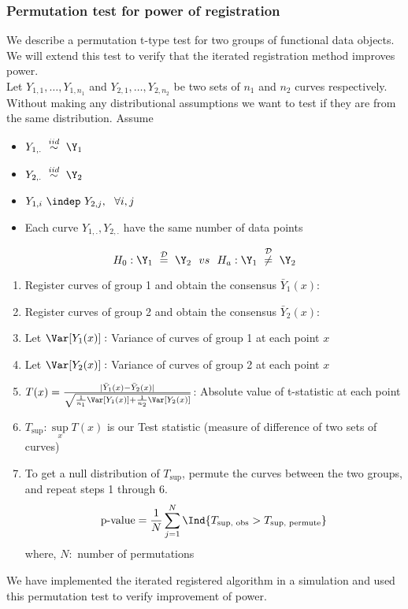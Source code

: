 \subsubsection*{Permutation test for power of registration}
We describe a permutation t-type test for two groups of functional data objects. We will extend this test to verify that the iterated registration method improves power. \\
Let $Y_{1,1}, \dots, Y_{1,n_1}$ and $Y_{2,1}, \dots, Y_{2,n_2}$ be two sets of $n_1$ and $n_2$ curves respectively. Without making any distributional assumptions we want to test if they are from the same distribution.
Assume 
\begin{itemize}
\item $Y_{1,.}\  \stackrel{iid}{\sim} \ \Y_1$
\item $Y_{2,.}\  \stackrel{iid}{\sim} \ \Y_2$
\item $Y_{1,i}\  \indep \ Y_{2,j}, \ \ \forall i, j$
\item Each curve $Y_{1,.}, Y_{2,.}$ have the same number of data points
\end{itemize}
\[ H_0: \Y_1 \ \stackrel{\mathcal{D}}{=} \ \Y_2 \ \ vs \ \ H_a: \Y_1 \ \stackrel{\mathcal{D}}{\ne} \ \Y_2 \]
\begin{enumerate}
\item Register curves of group 1 and obtain the consensus $\bar{Y}_1(x): $
\item Register curves of group 2 and obtain the consensus $\bar{Y}_2(x): $
\item Let $\Var[Y_1(x)]: $ Variance of curves of group 1 at each point $x$ 
\item Let $\Var[Y_2(x)]: $ Variance of curves of group 2 at each point $x$ 
\item $T(x) = \frac{|\bar{Y}_1(x) - \bar{Y}_2(x)|}{\sqrt{\frac{1}{n_1}\Var[Y_1(x)] + 
\frac{1}{n_2}\Var[Y_2(x)]}}$: Absolute value of t-statistic at each point
\item $T_{\text{sup}}:  \sup\limits_{x} T(x)$ is our Test statistic (measure of difference of two sets of curves)
\item To get a null distribution of $T_{\text{sup}}$, permute the curves between the two groups, and repeat steps 1 through 6. \\
\[  \text{p-value} = \frac{1}{N}\sum\limits_{j = 1}^{N}\Ind\{T_{\text{sup, obs}} > T_{\text{sup, permute}} \} \]
where, $N:$ number of permutations
\end{enumerate}

We have implemented the iterated registered algorithm in a simulation and used this permutation test to verify improvement of power. 
